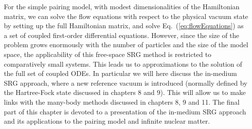 
\begin{figure*}[t]
  \begin{center}
    \texttt{[image: \\fdir/\{srg\_pairing\_delta1.0\_g0.5]}.pdf}
  \end{center}    
  \caption{\label{fig:srg_pairing}SRG evolution of the pairing Hamiltonian.}
\end{figure*}

For the simple pairing model, with modest dimensionalities of the
Hamiltonian matrix, we can solve the flow equations with respect to
the physical vacuum state by setting up the full Hamiltonian matrix,
and solve Eq.~(\ref{eq:flowEquations}) as a set of coupled first-order
differential equations. However, since the size of the problem grows
enormously with the number of particles and the size of the model
space, the applicability of this free-space SRG method is restricted
to comparatively small systems. This leads us to approximations to the
solution of the full set of coupled ODEs. In particular we will here
discuss the in-medium SRG approach, where a new reference vacuum is
introduced (normally defined by the Hartree-Fock state discussed in
chapters 8 and 9). This will allow us to make links with the many-body
methods discussed in chapters 8, 9 and 11. The final part of this
chapter is devoted to a presentation of the in-medium SRG approach and
its applications to the pairing model and infinite nuclear matter.

